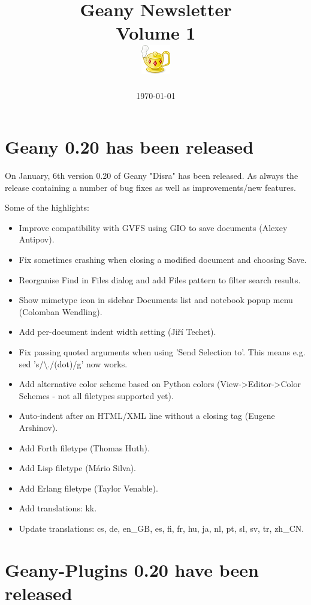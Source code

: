 \documentclass[%
paper=a4,%
fontsize=11pt,%
twoside=false,%
DIV18,
headsepline,
plainheadsepline,
footsepline,
plainfootsepline,
parskip=half,%
openany,%
]{scrartcl}
\title{Geany Newsletter \\ \small{Volume 1} \\ \includegraphics{img/geany.png}}
\date{\today}
\begin{document}
\maketitle{}
\tableofcontents{}

\section{Geany 0.20 has been released}

On January, 6th version 0.20 of Geany "Disra" has been released. As always
the release containing a number of bug fixes as well as
improvements/new features.

Some of the highlights:

\begin{itemize}
	\item Improve compatibility with GVFS using GIO to save documents (Alexey Antipov).
	\item Fix sometimes crashing when closing a modified document and choosing Save.
	\item Reorganise Find in Files dialog and add Files pattern to filter search results.
	\item Show mimetype icon in sidebar Documents list and notebook popup menu (Colomban Wendling).
	\item Add per-document indent width setting (Jiří Techet).
	\item Fix passing quoted arguments when using 'Send Selection to'. This means e.g. sed 's/\textbackslash{}./(dot)/g' now works.
	\item Add alternative color scheme based on Python colors (View->Editor->Color Schemes - not all filetypes supported yet).
	\item Auto-indent after an HTML/XML line without a closing tag (Eugene Arshinov).
	\item Add Forth filetype (Thomas Huth).
	\item Add Lisp filetype (Mário Silva).
	\item Add Erlang filetype (Taylor Venable).
	\item Add translations: kk.
	\item Update translations: cs, de, en\_GB, es, fi, fr, hu, ja, nl, pt, sl, sv, tr, zh\_CN.
\end{itemize}

\section{Geany-Plugins 0.20 have been released}
\end{document}

